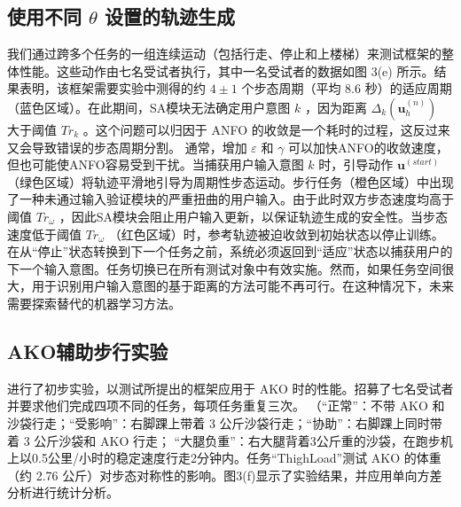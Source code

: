 
\subsection{使用不同    $\theta $    设置的轨迹生成  }    我们通过跨多个任务的一组连续运动（包括行走、停止和上楼梯）来测试框架的整体性能。这些动作由七名受试者执行，其中一名受试者的数据如图 3(e) 所示。结果表明，该框架需要实验中测得的约    $4\pm 1$    个步态周期（平均 8.6 秒）的适应周期（蓝色区域）。在此期间，SA模块无法确定用户意图   ${k}$   ，因为距离   ${\Delta _k}(\pmb{u}_h^{(n)})$   大于阈值   $T{r_k}$   。这个问题可以归因于 ANFO 的收敛是一个耗时的过程，这反过来又会导致错误的步态周期分割。
通常，增加   $\varepsilon $   和   $\gamma $   可以加快ANFO的收敛速度，但也可能使ANFO容易受到干扰。当捕获用户输入意图    ${k}$    时，引导动作    ${\pmb{u}^{(start)}}$   （绿色区域）将轨迹平滑地引导为周期性步态运动。步行任务（橙色区域）中出现了一种未通过输入验证模块的严重扭曲的用户输入。由于此时双方步态速度均高于阈值   $T{r_\omega }$   ，因此SA模块会阻止用户输入更新，以保证轨迹生成的安全性。当步态速度低于阈值   $T{r_\omega }$   （红色区域）时，参考轨迹被迫收敛到初始状态以停止训练。在从“停止”状态转换到下一个任务之前，系统必须返回到“适应”状态以捕获用户的下一个输入意图。任务切换已在所有测试对象中有效实施。然而，如果任务空间很大，用于识别用户输入意图的基于距离的方法可能不再可行。在这种情况下，未来需要探索替代的机器学习方法。

\subsection{AKO辅助步行实验  }    进行了初步实验，以测试所提出的框架应用于 AKO 时的性能。招募了七名受试者并要求他们完成四项不同的任务，每项任务重复三次。 （“正常”：不带 AKO 和沙袋行走；“受影响”：右脚踝上带着 3 公斤沙袋行走；“协助”：右脚踝上同时带着 3 公斤沙袋和 AKO 行走； “大腿负重”：右大腿背着3公斤重的沙袋，在跑步机上以0.5公里/小时的稳定速度行走2分钟内。任务“ThighLoad”测试 AKO 的体重（约 2.76 公斤）对步态对称性的影响。图3(f)显示了实验结果，并应用单向方差分析进行统计分析。  

